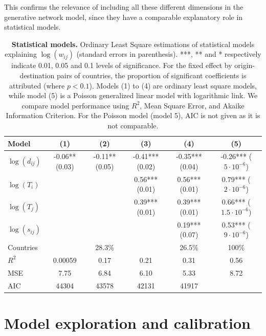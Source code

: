 \documentclass[10pt,letterpaper]{article}
\begin{document}
This confirms the relevance of including all these different dimensions in the generative network model, since they have a comparable explanatory role in statistical models.


\begin{table}[!ht]
\begin{adjustwidth}{-2.25in}{0in}
\caption{{\bf Statistical models.} Ordinary Least Square estimations of statistical models explaining $\log(w_{ij})$ (standard errors in parenthesis). ***, ** and * respectively indicate 0.01, 0.05 and 0.1 levels of significance. For the fixed effect by origin-destination pairs of countries, the proportion of significant coefficients is attributed (where $p<0.1$). Models (1) to (4) are ordinary least square models, while model (5) is a Poisson generalized linear model with logarithmic link. We compare model performance using $R^2$, Mean Square Error, and Akaike Information Criterion. For the Poisson model (model 5), AIC is not given as it is not comparable. \label{tab:reg}}
\medskip
\begin{tabular}{|l|c|c|c|c|c|}
\hline
Model  & (1) & (2) & (3) & (4) & (5) \\ 
\hline
$\log(d_{ij})$ &      -0.06** (0.03) &   -0.11** (0.05)  & -0.41*** (0.02)  & -0.35*** (0.04)  &  -0.26*** ($5\cdot 10^{-6}$) \\
$\log(T_i)$ &   &   & 0.56*** (0.01) &  0.56*** (0.01) & 0.79*** ($2\cdot 10^{-6}$) \\
$\log(T_j)$ &     &   & 0.39*** (0.01) &  0.39*** (0.01) & 0.66***  ($1.5\cdot 10^{-6}$) \\
$\log(s_{ij})$ &     &   &  &  0.19*** (0.07) & 0.53*** ($9\cdot 10^{-6}$)  \\
Countries &    &  28.3\% &   &  26.5\% & 100\% \\
\hline
$R^2$ &       0.00059   &  0.17 & 0.21 &  0.31  &  0.56 \\
MSE & 7.75 & 6.84 & 6.10 & 5.33 & 8.72 \\
AIC &        44304   &  43578  &  42131  & 41917 &   \\
\hline
\end{tabular}
\end{adjustwidth}
\end{table}





\section*{Model exploration and calibration}
\end{document}
